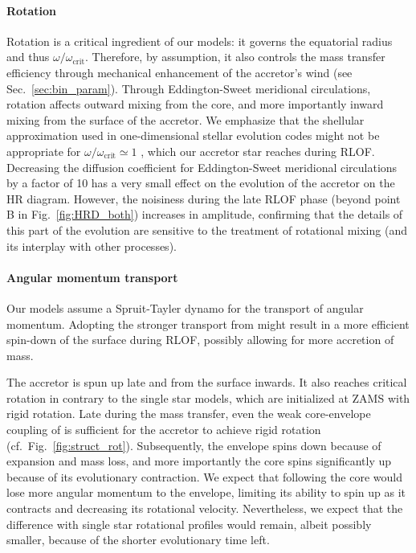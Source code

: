 \documentclass[twocolumn,twocolappendix,trackchanges]{aastex63}
\DeclareRobustCommand{\Figref}[1]{Fig.~\ref{#1}}
\DeclareRobustCommand{\Secref}[1]{Sec.~\ref{#1}}
\begin{document}
\paragraph{Rotation}
Rotation is a critical ingredient of our models: it governs the
equatorial radius and thus $\omega/\omega_\mathrm{crit}$. Therefore,
by assumption, it also controls the mass transfer efficiency through
mechanical enhancement of the accretor's wind (see
\Secref{sec:bin_param}). Through Eddington-Sweet meridional
circulations, rotation affects outward mixing from the core, and more
importantly inward mixing from the surface of the accretor.  We
emphasize that the shellular approximation used in one-dimensional
stellar evolution codes might not be appropriate for
$\omega/\omega_\mathrm{crit}\simeq 1$ \citep[e.g.][]{maeder:00}, which
our accretor star reaches during RLOF.  Decreasing the diffusion
coefficient for Eddington-Sweet meridional circulations by a factor of
10 has a very small effect on the evolution of the accretor on the HR
diagram. However, the noisiness during the late RLOF phase (beyond
point B in \Figref{fig:HRD_both}) increases in amplitude, confirming
that the details of this part of the evolution are sensitive to the
treatment of rotational mixing (and its interplay with other
processes).

\paragraph{Angular momentum transport}
Our models assume a Spruit-Tayler dynamo \citep{spruit:02} for the
transport of angular momentum. Adopting the
stronger transport from \cite{fuller:19} might result
in a more efficient spin-down of the surface during RLOF, possibly
allowing for more accretion of mass.

The accretor is spun up late and from the surface inwards. It also
reaches critical rotation in contrary to the single star models, which
are initialized at ZAMS with rigid rotation. Late during the mass
transfer, even the weak core-envelope coupling of \cite{spruit:02} is
sufficient for the accretor to achieve rigid rotation (cf.\
\Figref{fig:struct_rot}). Subsequently, the envelope spins down
because of expansion and mass loss, and more importantly the core spins
significantly up because of its evolutionary contraction. We expect
that following \cite{fuller:19} the core would lose more angular
momentum to the envelope, limiting its ability to spin up as it
contracts and decreasing its rotational velocity.  Nevertheless, we
expect that the difference with single star rotational profiles would
remain, albeit possibly smaller, because of the shorter evolutionary
time left.
\end{document}
